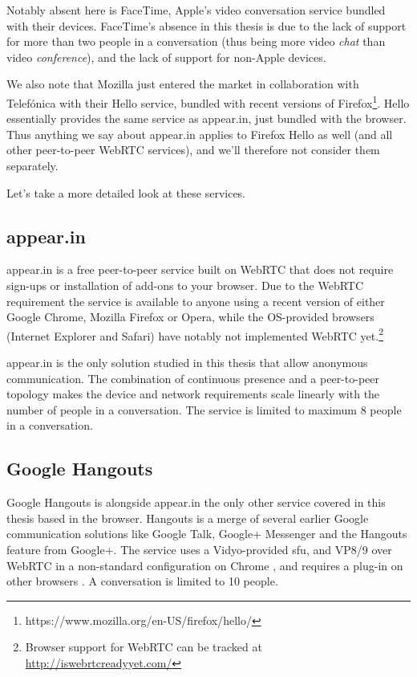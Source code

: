Notably absent here is FaceTime, Apple's video conversation service bundled with their devices. FaceTime's absence in this thesis is due to the lack of support for more than two people in a conversation (thus being more video \emph{chat} than video \emph{conference}), and the lack of support for non-Apple devices.

We also note that Mozilla just entered the market in collaboration with Telefónica with their Hello service, bundled with recent versions of Firefox\footnote{https://www.mozilla.org/en-US/firefox/hello/}. Hello essentially provides the same service as appear.in, just bundled with the browser. Thus anything we say about appear.in applies to Firefox Hello as well (and all other peer-to-peer WebRTC services), and we'll therefore not consider them separately.

Let's take a more detailed look at these services.

\subsection{appear.in}

appear.in is a free peer-to-peer service built on WebRTC that does not require sign-ups or installation of add-ons to your browser. Due to the WebRTC requirement the service is available to anyone using a recent version of either Google Chrome, Mozilla Firefox or Opera, while the OS-provided browsers (Internet Explorer and Safari) have notably not implemented WebRTC yet.\footnote{Browser support for WebRTC can be tracked at \url{http://iswebrtcreadyyet.com/}}

appear.in is the only solution studied in this thesis that allow anonymous communication. The combination of continuous presence and a peer-to-peer topology makes the device and network requirements scale linearly with the number of people in a conversation. The service is limited to maximum 8 people in a conversation.


\subsection{Google Hangouts}

Google Hangouts is alongside appear.in the only other service covered in this thesis based in the browser. Hangouts is a merge of several earlier Google communication solutions like Google Talk, Google+ Messenger and the Hangouts feature from Google+. The service uses a Vidyo-provided \gls{sfu}, and VP8/9 over WebRTC in a non-standard configuration on Chrome \cite{hangouts-webrtc}, and requires a plug-in on other browsers \cite{google-hangouts-support}. A conversation is limited to 10 people.

